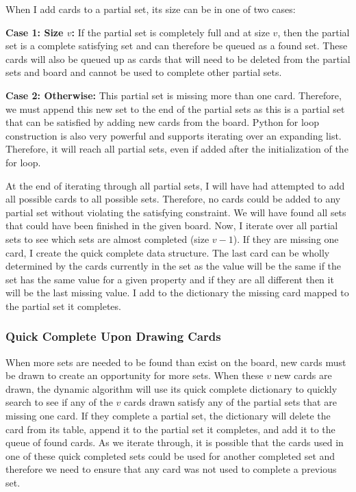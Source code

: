 \documentclass[pageno]{jpaper}
\begin{document}
When I add cards to a partial set, its size can be in one of two cases:

\textbf{Case 1: Size $v$:} If the partial set is completely full and at size $v$, then the partial set is a complete satisfying set and can therefore be queued as a found set. These cards will also be queued up as cards that will need to be deleted from the partial sets and board and cannot be used to complete other partial sets.

\textbf{Case 2: Otherwise:} This partial set is missing more than one card. Therefore, we must append this new set to the end of the partial sets as this is a partial set that can be satisfied by adding new cards from the board. Python for loop construction is also very powerful and supports iterating over an expanding list. Therefore, it will reach all partial sets, even if added after the initialization of the for loop. 

At the end of iterating through all partial sets, I will have had attempted to add all possible cards to all possible sets. Therefore, no cards could be added to any partial set without violating the satisfying constraint. We will have found all sets that could have been finished in the given board. Now, I iterate over all partial sets to see which sets are almost completed (size $v-1$). If they are missing one card, I create the quick complete data structure. The last card can be wholly determined by the cards currently in the set as the value will be the same if the set has the same value for a given property and if they are all different then it will be the last missing value. I add to the dictionary the missing card mapped to the partial set it completes.

\subsubsection{Quick Complete Upon Drawing Cards}

When more sets are needed to be found than exist on the board, new cards must be drawn to create an opportunity for more sets. When these $v$ new cards are drawn, the dynamic algorithm will use its quick complete dictionary to quickly search to see if any of the $v$ cards drawn satisfy any of the partial sets that are missing one card. If they complete a partial set, the dictionary will delete the card from its table, append it to the partial set it completes, and add it to the queue of found cards. As we iterate through, it is possible that the cards used in one of these quick completed sets could be used for another completed set and therefore we need to ensure that any card was not used to complete a previous set. 
\end{document}
